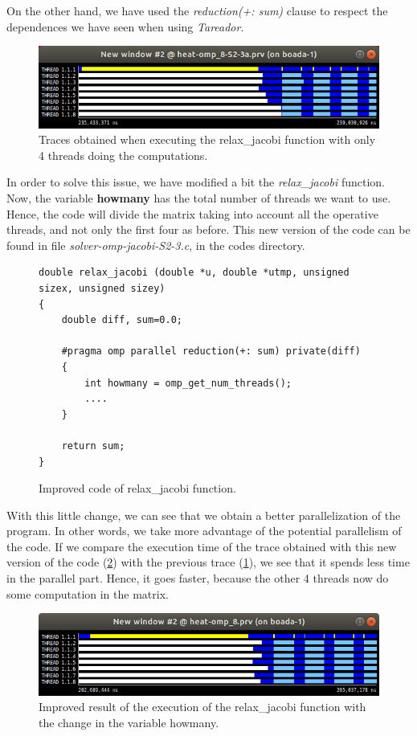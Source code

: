 \documentclass[12pt, a4paper]{article}
\begin{document}
On the other hand, we have used the \textit{reduction(+: sum)} clause to respect the dependences we have seen when using \textit{Tareador}.

\begin{figure}[H]
	\centering
	\includegraphics[scale=0.50]{./images/paraver-jacobi-s2-3a.png}
	\caption{Traces obtained when executing the relax\_jacobi function with only 4 threads doing the computations.}
	\label{jacobi-2}
\end{figure}

In order to solve this issue, we have modified a bit the \textit{relax\_jacobi} function. Now, the variable \textbf{howmany} has the total number of threads we want to use. Hence, the code will divide the matrix taking into account all the operative threads, and not only the first four as before. This new version of the code can be found in file \textit{solver-omp-jacobi-S2-3.c}, in the codes directory.

 \begin{figure}[H]
\begin{lstlisting}
double relax_jacobi (double *u, double *utmp, unsigned sizex, unsigned sizey)
{
	double diff, sum=0.0;

	#pragma omp parallel reduction(+: sum) private(diff)
	{
		int howmany = omp_get_num_threads();
		....
	}

    return sum;
}
\end{lstlisting}
\caption{Improved code of relax\_jacobi function.}
\end{figure}

With this little change, we can see that we obtain a better parallelization of the program. In other words, we take more advantage of the potential parallelism of the code. If we compare the execution time of the trace obtained with this new version of the code (\ref{fig:jacobi-3}) with the previous trace (\ref{jacobi-2}), we see that it spends less time in the parallel part. Hence, it goes faster, because the other 4 threads now do some computation in the matrix.

\begin{figure}[H]
	\centering
	\includegraphics[scale=0.50]{./images/paraver-jacobi-s2-3b.png}
	\caption{Improved result of the execution of the relax\_jacobi function with the change in the variable howmany.}
	\label{fig:jacobi-3}
\end{figure}
\end{document}
